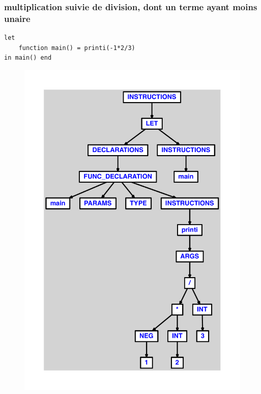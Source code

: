\documentclass{article}
\begin{document}
\subsubsection{multiplication suivie de division, dont un terme ayant moins unaire}
\begin{lstlisting}
let
	function main() = printi(-1*2/3)
in main() end
\end{lstlisting}
\newpage
\begin{figure}[H]
\centering
\includegraphics[max width=\textwidth]{ast/ast_74.pdf}
\end{figure}
\newpage
\end{document}
